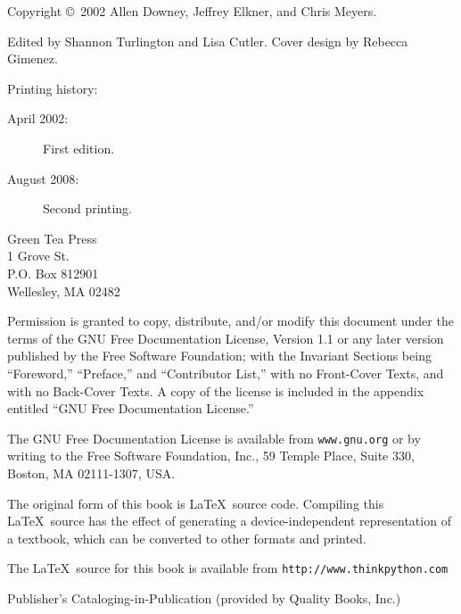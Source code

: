 \documentclass[10pt]{book}
\begin{document}
{\small
Copyright \copyright ~2002 Allen Downey, Jeffrey Elkner, and Chris Meyers.

Edited by Shannon Turlington and Lisa Cutler.  Cover design by Rebecca Gimenez.

Printing history:

\begin{description}

\item[April 2002:] First edition.

\item[August 2008:] Second printing.

\end{description}

\vspace{0.2in}

\begin{flushleft}
Green Tea Press       \\
1 Grove St.           \\
P.O. Box 812901       \\
Wellesley, MA 02482   \\
\end{flushleft}

Permission is granted to copy, distribute, and/or modify this document
under the terms of the GNU Free Documentation License, Version 1.1 or
any later version published by the Free Software Foundation; with the
Invariant Sections being ``Foreword,'' ``Preface,'' and ``Contributor
List,'' with no Front-Cover Texts, and with no Back-Cover Texts. A
copy of the license is included in the appendix entitled ``GNU Free
Documentation License.''

The GNU Free Documentation License is available from {\tt www.gnu.org}
or by writing to the Free Software Foundation, Inc., 59 Temple Place,
Suite 330, Boston, MA 02111-1307, USA.

The original form of this book is \LaTeX\ source code.  Compiling this
\LaTeX\ source has the effect of generating a device-independent
representation of a textbook, which can be converted to other formats
and printed.

The \LaTeX\ source for this book is available from
{\tt http://www.thinkpython.com}

\vspace{0.2in}

Publisher's Cataloging-in-Publication (provided by Quality Books, Inc.)

}
\end{document}
